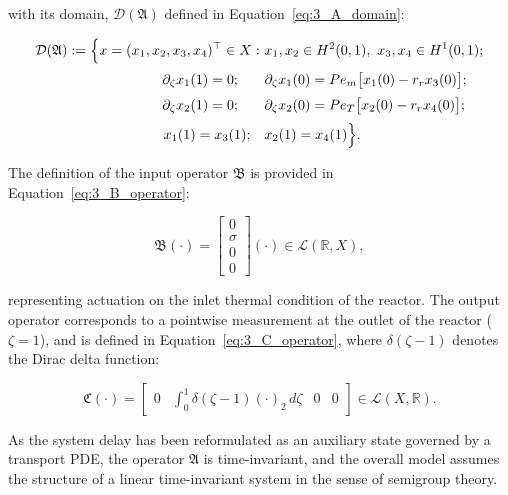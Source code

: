 with its domain, $\mathcal{D}(\mathfrak{A})$ defined in Equation~\eqref{eq:3_A_domain}:

\begin{equation} \label{eq:3_A_domain}
\begin{aligned}
\mathcal{D}(\mathfrak{A}) := \Big\{ x = (x_1, x_2, x_3, x_4)^\top \in X :\ 
& x_1, x_2 \in H^2(0,1),\ x_3, x_4 \in H^1(0,1); \\[0.5ex]
\partial_\zeta x_1(1) = 0; \hspace{1.9em} & \partial_\zeta x_1(0) = Pe_m \bigl[ x_1(0) - r_r x_3(0) \bigr]; \\[0.5ex]
\partial_\zeta x_2(1) = 0; \hspace{1.9em} & \partial_\zeta x_2(0) = Pe_T \bigl[ x_2(0) - r_r x_4(0) \bigr]; \\[0.5ex]
x_1(1) = x_3(1); \quad & x_2(1) = x_4(1)
\Big\}.
\end{aligned}
\end{equation}

The definition of the input operator $\mathfrak{B}$ is provided in Equation~\eqref{eq:3_B_operator}:

\begin{equation} \label{eq:3_B_operator}
\mathfrak{B} (\cdot) = \begin{bmatrix} 0 \\ \sigma \\ 0 \\ 0 \end{bmatrix} (\cdot) \in \mathcal{L}(\mathbb{R}, X),
\end{equation}

representing actuation on the inlet thermal condition of the reactor. The output operator corresponds to a pointwise measurement at the outlet of the reactor ($\zeta = 1$), and is defined in Equation~\eqref{eq:3_C_operator}, where $\delta(\zeta - 1)$ denotes the Dirac delta function:

\begin{equation} \label{eq:3_C_operator}
\mathfrak{C} (\cdot) = \begin{bmatrix} 0 & \int_0^1 \delta(\zeta - 1)(\cdot)_2\, d\zeta & 0 & 0 \end{bmatrix} \in \mathcal{L}(X, \mathbb{R}).
\end{equation}

As the system delay has been reformulated as an auxiliary state governed by a transport PDE, the operator $\mathfrak{A}$ is time-invariant, and the overall model assumes the structure of a linear time-invariant system in the sense of semigroup theory.


